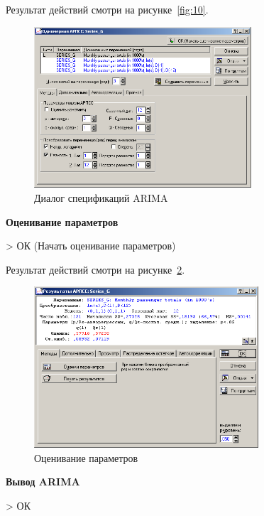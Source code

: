 Результат действий смотри на рисунке~\ref{fig:10}.

\begin{figure}[!h]
  \centering

  \includegraphics[height=6cm]
  {inc/11.PNG}

  \caption{Диалог спецификаций ARIMA}

  \label{fig:11}
\end{figure}

\begin{center}
  \textbf{Оценивание параметров}
\end{center}

> ОК (Начать оценивание параметров)

Результат действий смотри на рисунке~\ref{fig:12}.

\begin{figure}[!h]
  \centering

  \includegraphics[height=6cm]
  {inc/12.PNG}

  \caption{Оценивание параметров}

  \label{fig:12}
\end{figure}

\begin{center}
  \textbf{Вывод ARIMA}
\end{center}

> ОК

